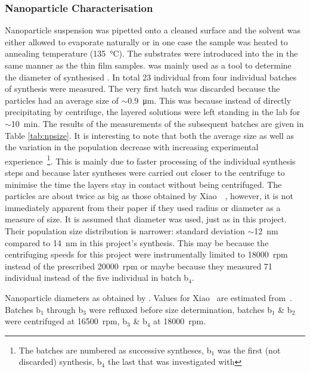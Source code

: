 \subsubsection{Nanoparticle Characterisation}
Nanoparticle suspension was pipetted onto a cleaned \ito{} surface and the solvent was either allowed to evaporate naturally or in one case the sample was heated to annealing temperature (\SI{135}{\degreeCelsius}). The \ito{} substrates were introduced into the \sem{} in the same manner as the thin film samples. \sem{} was mainly used as a tool to determine the diameter of synthesised \nps{}. In total 23 individual \nps{} from four individual batches of synthesis were measured. The very first batch was discarded because the particles had an average size of $\sim$\SI{0.9}{\micro\metre}. This was because instead of directly precipitating by centrifuge, the layered solutions were left standing in the lab for $\sim$\SI{10}{\minute}. The results of the measurements of the subsequent batches are given in Table \ref{tab:npsize}. It is interesting to note that both the average size as well as the variation in the population decrease with increasing experimental experience~\footnote{The batches are numbered as successive syntheses,\ie{} b$_1$ was the first (not discarded) synthesis, b$_4$ the last that was investigated with \sem{}}. This is mainly due to faster processing of the individual synthesis steps and because later syntheses were carried out closer to the centrifuge to minimise the time the layers stay in contact without being centrifuged. The particles are about twice as big as those obtained by Xiao~\etal{}~\cite{NPsynthesis}, however, it is not immediately apparent from their paper if they used \np{} radius or \np{} diameter as a measure of size. It is assumed that diameter was used, just as in this project. Their population size distribution is narrower: standard deviation $\sim$\SI{12}{\nano\metre} compared to \SI{14}{\nano\metre} in this project's  synthesis. This may be because the centrifuging speeds for this project were instrumentally limited to \SI{18000}{rpm} instead of the prescribed \SI{20000}{rpm} or maybe because they measured \num{71} individual \nps{} instead of the five individual \nps{} in batch b$_4$.
\begin{table}
\centering
\caption[Nanoparticle diameters as obtained by \sem{}. Batches b$_1$ through b$_3$ were refluxed before size determination, batches b$_1$ \& b$_2$ were centrifuged at \SI{16500}{rpm}, b$_3$ \& b$_4$ at \SI{18000}{rpm}.]{Nanoparticle diameters as obtained by \sem{}. Values for Xiao~\etal{} are estimated from~\cite[Figure 1f)]{NPsynthesis}. Batches b$_1$ through b$_3$ were refluxed before size determination, batches b$_1$ \& b$_2$ were centrifuged at \SI{16500}{rpm}, b$_3$ \& b$_4$ at \SI{18000}{rpm}.}
\label{tab:npsize}

\end{table}
